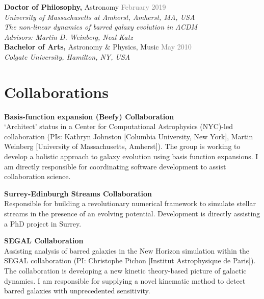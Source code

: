 \documentclass[margin, a4paper,11pt]{res} %
\begin{document}
\begin{resume}
{\bf Doctor of Philosophy,} Astronomy \hfill \textcolor{grey}{February 2019}\\
\hspace*{0.25 in} {\sl \textcolor{blueshade}{University of Massachusetts at Amherst, Amherst, MA, USA}}\\
\hspace*{0.25 in} {\sl \textcolor{blueshade}{The non-linear dynamics of barred galaxy evolution in $\Lambda$CDM}}\\
\hspace*{0.25 in} {\sl Advisors: Martin D. Weinberg, Neal Katz}\\
{\bf Bachelor of Arts,} Astronomy \& Physics, Music \hfill \textcolor{grey}{May 2010}\\
\hspace*{0.25 in} {\sl Colgate University, Hamilton, NY, USA}

\section{\sc \textcolor{redshade}{Collaborations}}

{\bf Basis-function expansion (Beefy) Collaboration} \\
`Architect' status in a Center for Computational Astrophysics (NYC)-led collaboration (PIs: Kathryn Johnston [Columbia University, New York], Martin Weinberg [University of Massachusetts, Amherst]). The group is working to develop a holistic approach to galaxy evolution using basis function expansions. I am directly responsible for coordinating software development to assist collaboration science.

{\bf Surrey-Edinburgh Streams Collaboration}\\
Responsible for building a revolutionary numerical framework to simulate stellar streams in the presence of an evolving potential. Development is directly assisting a PhD project in Surrey.

{\bf SEGAL Collaboration} \\
Assisting analysis of barred galaxies in the New Horizon simulation within the SEGAL collaboration (PI: Christophe Pichon [Institut Astrophysique de Paris]). The collaboration is developing a new kinetic theory-based picture of galactic dynamics. I am responsible for supplying a novel kinematic method to detect barred galaxies with unprecedented sensitivity.


\end{resume}
\end{document}
